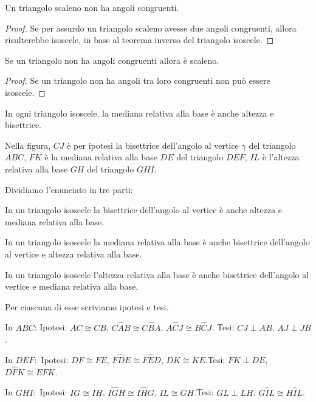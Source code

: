 \begin{corollario}
Un triangolo scaleno non ha angoli congruenti.
\end{corollario}

\begin{proof}
Se per assurdo un triangolo scaleno avesse due angoli congruenti, allora risulterebbe isoscele, in base al teorema inverso del triangolo isoscele.
\end{proof}

\begin{corollario}
Se un triangolo non ha angoli congruenti allora è scaleno.
\end{corollario}

\begin{proof}
Se un triangolo non ha angoli tra loro congruenti non può essere isoscele.
\end{proof}

\begin{proposizione}
In ogni triangolo isoscele, la mediana relativa alla base è anche altezza e bisettrice.
\end{proposizione}
Nella figura, $CJ$ è per ipotesi la bisettrice dell'angolo al vertice $\gamma$ del triangolo $ABC$, $FK$ è la mediana relativa alla base $DE$ del triangolo $DEF$, $IL$ è l'altezza relativa alla base $GH$ del triangolo $GHI$.


Dividiamo l'enunciato in tre parti:
\begin{enumeratea}
\item In un triangolo isoscele la bisettrice dell'angolo al vertice è anche altezza e mediana relativa alla base.
\item In un triangolo isoscele la mediana relativa alla base è anche bisettrice dell'angolo al vertice e altezza relativa alla base.
\item In un triangolo isoscele l'altezza relativa alla base è anche bisettrice dell'angolo al vertice e mediana relativa alla base.
\end{enumeratea}

Per ciascuna di esse scriviamo ipotesi e tesi.
\begin{enumeratea}
\item In $ABC$:	Ipotesi: $AC\cong CB$, $C\widehat{A}B\cong C\widehat{B}A$, $A\widehat{C}J\cong B\widehat{C}J$. Tesi: $CJ\perp AB$, $AJ\perp JB$.
\item In $DEF$:	\,Ipotesi: $DF\cong FE$, $F\widehat{D}E\cong F\widehat{E}D$, $DK\cong KE$.\tab Tesi: $FK\perp DE$, $D\widehat{F}K\cong E\widehat{F}K$.
\item In $GHI$:	\,Ipotesi: $IG\cong IH$, $I\widehat{G}H\cong I\widehat{H}G$, $IL\cong GH$.\tab Tesi: $GL\perp LH$, $G\widehat{I}L\cong H\widehat{I}L$.
\end{enumeratea}

